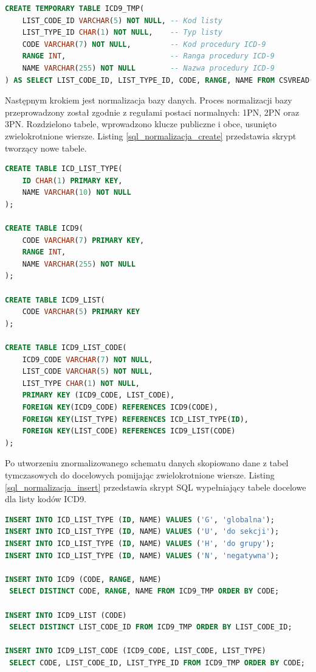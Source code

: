 \begin{lstlisting}[language=SQL,caption={Import listy kodów ICD9 z pliku CSV.},label=sql_import_csv]
CREATE TEMPORARY TABLE ICD9_TMP(
    LIST_CODE_ID VARCHAR(5) NOT NULL, -- Kod listy
    LIST_TYPE_ID CHAR(1) NOT NULL,    -- Typ listy
    CODE VARCHAR(7) NOT NULL,         -- Kod procedury ICD-9
    RANGE INT,                        -- Ranga procedury ICD-9
    NAME VARCHAR(255) NOT NULL        -- Nazwa procedury ICD-9
) AS SELECT LIST_CODE_ID, LIST_TYPE_ID, CODE, RANGE, NAME FROM CSVREAD('icd9.csv');
\end{lstlisting}

Następnym krokiem jest normalizacja bazy danych. Proces normalizacji bazy przeprowadzony został zgodnie z regułami postaci normalnych: 1PN, 2PN oraz 3PN\cite{bazy_mimuw}. Rozdzielono tabele, wprowadzono klucze publiczne i obce, usunięto zwielokrotnione wiersze. Listing \ref{sql_normalizacja_create} przedstawia skrypt tworzący nowe tabele.
\newpage
\begin{lstlisting}[language=SQL,caption={Normalizacja - tworzenie tabel dla listy kodów ICD9.},label=sql_normalizacja_create]
CREATE TABLE ICD_LIST_TYPE(
    ID CHAR(1) PRIMARY KEY,
    NAME VARCHAR(10) NOT NULL
);

CREATE TABLE ICD9(
    CODE VARCHAR(7) PRIMARY KEY,
    RANGE INT,
    NAME VARCHAR(255) NOT NULL
);

CREATE TABLE ICD9_LIST(
    CODE VARCHAR(5) PRIMARY KEY
);

CREATE TABLE ICD9_LIST_CODE(
    ICD9_CODE VARCHAR(7) NOT NULL,
    LIST_CODE VARCHAR(5) NOT NULL,
    LIST_TYPE CHAR(1) NOT NULL,
    PRIMARY KEY (ICD9_CODE, LIST_CODE),
    FOREIGN KEY(ICD9_CODE) REFERENCES ICD9(CODE),
    FOREIGN KEY(LIST_TYPE) REFERENCES ICD_LIST_TYPE(ID),
    FOREIGN KEY(LIST_CODE) REFERENCES ICD9_LIST(CODE)
);
\end{lstlisting}

Po utworzeniu znormalizowanego schematu danych skopiowano dane z tabel tymczasowych do docelowych pomijając zwielokrotnione wiersze. Listing \ref{sql_normalizacja_insert} przedstawia skrypt SQL wypełniający tabele docelowe dla listy kodów ICD9.

\begin{lstlisting}[language=SQL,caption={Normalizacja - wypełnianie tabel danymi dla listy kodów ICD9.},label=sql_normalizacja_insert]
INSERT INTO ICD_LIST_TYPE (ID, NAME) VALUES ('G', 'globalna');
INSERT INTO ICD_LIST_TYPE (ID, NAME) VALUES ('U', 'do sekcji');
INSERT INTO ICD_LIST_TYPE (ID, NAME) VALUES ('H', 'do grupy');
INSERT INTO ICD_LIST_TYPE (ID, NAME) VALUES ('N', 'negatywna');

INSERT INTO ICD9 (CODE, RANGE, NAME)
 SELECT DISTINCT CODE, RANGE, NAME FROM ICD9_TMP ORDER BY CODE;

INSERT INTO ICD9_LIST (CODE)
 SELECT DISTINCT LIST_CODE_ID FROM ICD9_TMP ORDER BY LIST_CODE_ID;

INSERT INTO ICD9_LIST_CODE (ICD9_CODE, LIST_CODE, LIST_TYPE)
 SELECT CODE, LIST_CODE_ID, LIST_TYPE_ID FROM ICD9_TMP ORDER BY CODE;
\end{lstlisting}

